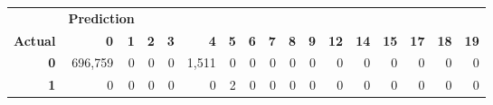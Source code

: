 \begin{table}[H]
\centering
\begin{tabular}{rrrrrrrrrrrrrrrrr}
\multicolumn{1}{l}{}                 & \multicolumn{2}{l}{\textbf{Prediction}}                           & \multicolumn{1}{l}{}            & \multicolumn{1}{l}{}            & \multicolumn{1}{l}{}            & \multicolumn{1}{l}{}            & \multicolumn{1}{l}{}            & \multicolumn{1}{l}{}            & \multicolumn{1}{l}{}            & \multicolumn{1}{l}{}            & \multicolumn{1}{l}{}             & \multicolumn{1}{l}{}             & \multicolumn{1}{l}{}             & \multicolumn{1}{l}{}             & \multicolumn{1}{l}{}             & \multicolumn{1}{l}{}             \\ \cline{2-17} 
\multicolumn{1}{r|}{\textbf{Actual}} & \multicolumn{1}{r|}{\textbf{0}} & \multicolumn{1}{r|}{\textbf{1}} & \multicolumn{1}{r|}{\textbf{2}} & \multicolumn{1}{r|}{\textbf{3}} & \multicolumn{1}{r|}{\textbf{4}} & \multicolumn{1}{r|}{\textbf{5}} & \multicolumn{1}{r|}{\textbf{6}} & \multicolumn{1}{r|}{\textbf{7}} & \multicolumn{1}{r|}{\textbf{8}} & \multicolumn{1}{r|}{\textbf{9}} & \multicolumn{1}{r|}{\textbf{12}} & \multicolumn{1}{r|}{\textbf{14}} & \multicolumn{1}{r|}{\textbf{15}} & \multicolumn{1}{r|}{\textbf{17}} & \multicolumn{1}{r|}{\textbf{18}} & \multicolumn{1}{r|}{\textbf{19}} \\ \hline
\multicolumn{1}{|r|}{\textbf{0}}     & \multicolumn{1}{r|}{696,759}     & \multicolumn{1}{r|}{0}          & \multicolumn{1}{r|}{0}          & \multicolumn{1}{r|}{0}          & \multicolumn{1}{r|}{1,511}       & \multicolumn{1}{r|}{0}          & \multicolumn{1}{r|}{0}          & \multicolumn{1}{r|}{0}          & \multicolumn{1}{r|}{0}          & \multicolumn{1}{r|}{0}          & \multicolumn{1}{r|}{0}           & \multicolumn{1}{r|}{0}           & \multicolumn{1}{r|}{0}           & \multicolumn{1}{r|}{0}           & \multicolumn{1}{r|}{0}           & \multicolumn{1}{r|}{0}           \\ \hline
\multicolumn{1}{|r|}{\textbf{1}}     & \multicolumn{1}{r|}{0}          & \multicolumn{1}{r|}{0}          & \multicolumn{1}{r|}{0}          & \multicolumn{1}{r|}{0}          & \multicolumn{1}{r|}{0}          & \multicolumn{1}{r|}{2}          & \multicolumn{1}{r|}{0}          & \multicolumn{1}{r|}{0}          & \multicolumn{1}{r|}{0}          & \multicolumn{1}{r|}{0}          & \multicolumn{1}{r|}{0}           & \multicolumn{1}{r|}{0}           & \multicolumn{1}{r|}{0}           & \multicolumn{1}{r|}{0}           & \multicolumn{1}{r|}{0}           & \multicolumn{1}{r|}{0}           \\ \hline

\end{tabular}
\end{table}
